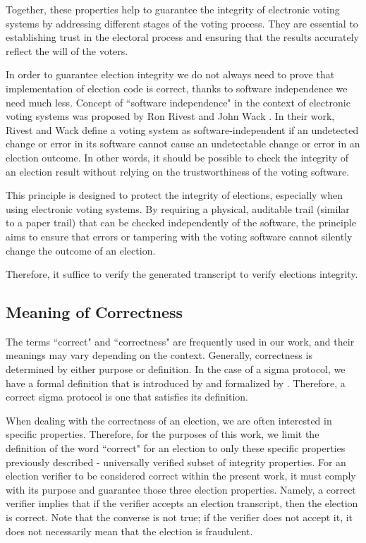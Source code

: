 Together, these properties help to guarantee the integrity of electronic voting systems by addressing different stages of the voting process. They are essential to establishing trust in the electoral process and ensuring that the results accurately reflect the will of the voters.

In order to guarantee election integrity we do not always need to prove that implementation of election code is correct, thanks to software independence we need much less.
Concept of ``software independence" in the context of electronic voting systems was proposed by Ron Rivest and John Wack \cite{Rivest2008OnTN}. In their work, Rivest and Wack define a voting system as software-independent if an undetected change or error in its software cannot cause an undetectable change or error in an election outcome. In other words, it should be possible to check the integrity of an election result without relying on the trustworthiness of the voting software.

This principle is designed to protect the integrity of elections, especially when using electronic voting systems. By requiring a physical, auditable trail (similar to a paper trail) that can be checked independently of the software, the principle aims to ensure that errors or tampering with the voting software cannot silently change the outcome of an election.

Therefore, it suffice to verify the generated transcript to verify elections integrity.


    \subsection{Meaning of Correctness} 
    
    The terms ``correct" and ``correctness" are frequently used in our work, and their meanings may vary depending on the context. Generally, correctness is determined by either purpose or definition. In the case of a sigma protocol, we have a formal definition that is introduced by \cite{Cramer1997ModularDO} and formalized by \cite{Barthe2009FormalCO, Smyth2015ElectionVC}. Therefore, a correct sigma protocol is one that satisfies its definition.
    
    When dealing with the correctness of an election, we are often interested in specific properties. Therefore, for the purposes of this work, we limit the definition of the word ``correct" for an election to only these specific properties previously described - universally verified subset of integrity properties. For an election verifier to be considered correct within the present work, it must comply with its purpose and guarantee those three election properties. Namely, a correct verifier implies that if the verifier accepts an election transcript, then the election is correct. Note that the converse is not true; if the verifier does not accept it, it does not necessarily mean that the election is fraudulent.
    
